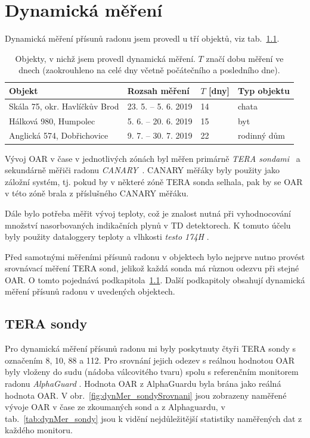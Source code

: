 \chapter{Dynamická měření}\label{navesti:dynamickaMereni}
Dynamická měření přísunů radonu jsem provedl u tří objektů, viz tab.~\ref{tab:dynMer_prehled}.
\begin{table}[ht]
	\centering
	\caption{Objekty, v nichž jsem provedl dynamická měření. $T$ značí dobu měření ve dnech (zaokrouhleno na celé dny včetně počátečního a posledního dne).}
	\label{tab:dynMer_prehled}
	\begin{tabular}{llll}
		\toprule
		Objekt & Rozsah měření & $T$ [dny] & Typ objektu\\
		\midrule
		Skála 75, okr. Havlíčkův Brod & 23. 5. -- 5. 6. 2019 & 14 & chata\\
		Hálková 980, Humpolec & 5. 6. -- 20. 6. 2019 & 15 & byt\\
		Anglická 574, Dobřichovice & 9. 7. -- 30. 7. 2019 & 22 & rodinný dům\\
		\bottomrule
	\end{tabular}
\end{table}

Vývoj OAR v čase v jednotlivých zónách byl měřen primárně \emph{TERA sondami}~\cite{tera} a sekundárně měřiči radonu \emph{CANARY}~\cite{canary}. CANARY měřáky byly použity jako záložní systém, tj. pokud by v některé zóně  TERA sonda selhala, pak by se OAR v této zóně brala z příslušného CANARY měřáku. %

Dále bylo potřeba měřit vývoj teploty, což je znalost nutná při vyhodnocování množství nasorbovaných indikačních plynů v TD detektorech. K tomuto účelu byly použity dataloggery teploty a vlhkosti \emph{testo 174H} \cite{testo}.

Před samotnými měřeními přísunů radonu v objektech bylo nejprve nutno provést srovnávací měření TERA sond, jelikož každá sonda má různou odezvu při stejné OAR. O tomto pojednává podkapitola~\ref{navesti:dynMer_TERA}. Další podkapitoly obsahují dynamická měření přísunů radonu v uvedených objektech. 
\section{TERA sondy}\label{navesti:dynMer_TERA}
Pro dynamická měření přísunů radonu mi byly poskytnuty čtyři TERA sondy s označením 8, 10, 88 a 112. Pro srovnání jejich odezev s reálnou hodnotou OAR byly vloženy do sudu (nádoba válcovitého tvaru) spolu s referenčním monitorem radonu \emph{AlphaGuard} \cite{alphaguard}. Hodnota OAR z AlphaGuardu byla brána jako reálná hodnota OAR. V obr.~\ref{fig:dynMer_sondySrovnani} jsou zobrazeny naměřené vývoje OAR v čase ze zkoumaných sond a z Alphaguardu, v tab.~\ref{tab:dynMer_sondy} jsou k vidění nejdůležitější statistiky naměřených dat z každého monitoru.

